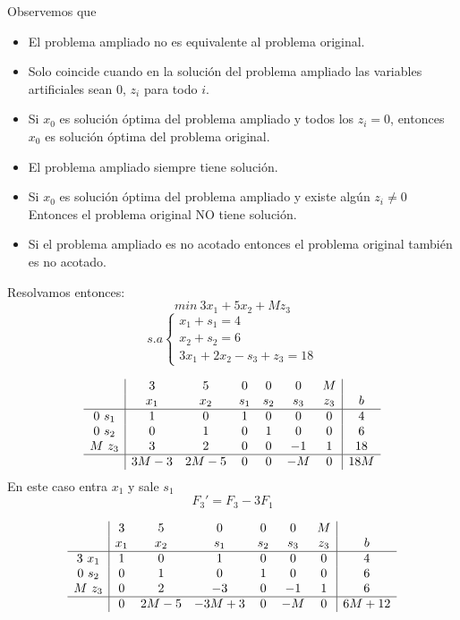 Observemos que
\begin{itemize}
  \item El problema ampliado no es equivalente al problema original. 
  \item Solo coincide cuando en la solución del problema ampliado las variables artificiales sean $0$, $z_i$ para todo $i$.
  \item Si $x_0$ es solución óptima del problema ampliado y todos los $z_i=0$, entonces $x_0$ es solución óptima del problema original. 
  \item El problema ampliado siempre tiene solución.
  \item Si $x_0$ es solución óptima del problema ampliado y existe algún $z_i \neq 0$ \\
  Entonces el problema original NO tiene solución.
  \item Si el problema ampliado es no acotado entonces el problema original también es no acotado.
\end{itemize} 
Resolvamos entonces:
$$ min ~ 3x_1+5x_2+M z_3 $$
$$ s.a \left\{
  \begin{array}{c}
    x_1+s_1=4 \\
    x_2 + s_2 = 6 \\
    3x_1+2x_2-s_3+z_3=18
  \end{array}
\right.
$$

$$
\begin{array}{c|cccccc|c}
  & 3 & 5 & 0 & 0 & 0 & M & \\
  & x_1 & x_2 & s_1 & s_2 & s_3 & z_3 & b \\ \hline
  0 ~ s_1 & 1 & 0 & 1 & 0 & 0 & 0 & 4 \\
  0 ~ s_2 & 0 & 1 & 0 & 1 & 0 & 0 & 6 \\
  M ~ z_3 & 3 & 2 & 0 & 0 & -1 & 1 & 18 \\ \hline
  & 3M-3 & 2M-5 & 0 & 0 & -M & 0 & 18M
\end{array}
$$
En este caso entra $x_1$ y sale $s_1$
$$F_3'=F_3-3F_1$$

$$
\begin{array}{c|cccccc|c}
  & 3 & 5 & 0 & 0 & 0 & M & \\
  & x_1 & x_2 & s_1 & s_2 & s_3 & z_3 & b \\ \hline
  3 ~ x_1 & 1 & 0 & 1 & 0 & 0 & 0 & 4 \\
  0 ~ s_2 & 0 & 1 & 0 & 1 & 0 & 0 & 6 \\
  M ~ z_3 & 0 & 2 & -3 & 0 & -1 & 1 & 6 \\ \hline
  & 0 & 2M-5 & -3M+3 & 0 & -M & 0 & 6M+12
\end{array}
$$

